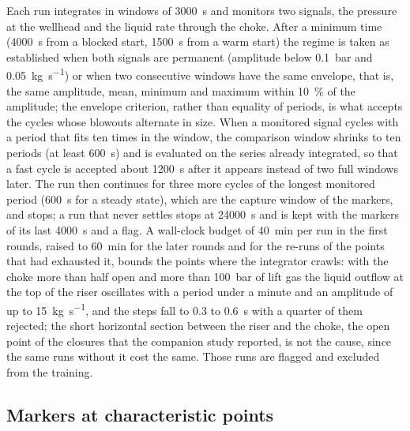 \documentclass[a4paper,fleqn]{cas-sc}
\begin{document}
Each run integrates in windows of \SI{3000}{\second} and monitors two signals, the pressure at the wellhead and the liquid rate through the choke. After a minimum time (\SI{4000}{\second} from a blocked start, \SI{1500}{\second} from a warm start) the regime is taken as established when both signals are permanent (amplitude below \SI{0.1}{\bar} and \SI{0.05}{\kilogram\per\second}) or when two consecutive windows have the same envelope, that is, the same amplitude, mean, minimum and maximum within \SI{10}{\percent} of the amplitude; the envelope criterion, rather than equality of periods, is what accepts the cycles whose blowouts alternate in size. When a monitored signal cycles with a period that fits ten times in the window, the comparison window shrinks to ten periods (at least \SI{600}{\second}) and is evaluated on the series already integrated, so that a fast cycle is accepted about \SI{1200}{\second} after it appears instead of two full windows later. The run then continues for three more cycles of the longest monitored period (\SI{600}{\second} for a steady state), which are the capture window of the markers, and stops; a run that never settles stops at \SI{24000}{\second} and is kept with the markers of its last \SI{4000}{\second} and a flag. A wall-clock budget of \SI{40}{\minute} per run in the first rounds, raised to \SI{60}{\minute} for the later rounds and for the re-runs of the points that had exhausted it, bounds the points where the integrator crawls: with the choke more than half open and more than \SI{100}{\bar} of lift gas the liquid outflow at the top of the riser oscillates with a period under a minute and an amplitude of up to \SI{15}{\kilogram\per\second}, and the steps fall to 0.3 to \SI{0.6}{\second} with a quarter of them rejected; the short horizontal section between the riser and the choke, the open point of the closures that the companion study reported, is not the cause, since the same runs without it cost the same. Those runs are flagged and excluded from the training.

\subsection{Markers at characteristic points}\label{sec:markers}
\end{document}
